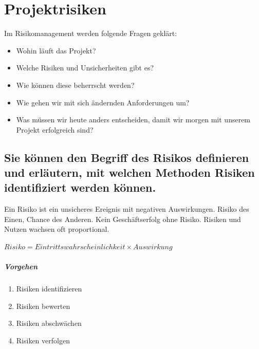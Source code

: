 \chapter{Projektrisiken}
Im Risikomanagement werden folgende Fragen geklärt:

\begin{itemize}
	\item Wohin läuft das Projekt?
	\item Welche Risiken und Unsicherheiten gibt es?
	\item Wie können diese beherrscht werden?
	\item Wie gehen wir mit sich ändernden Anforderungen um?
	\item Was müssen wir heute anders entscheiden, damit wir morgen mit unserem Projekt erfolgreich sind?
\end{itemize}

\section{Sie können den Begriff des Risikos definieren und erläutern, mit welchen Methoden Risiken identifiziert werden können.}
\label{sec:risikomanagement-definition-risiko}

Ein Risiko ist ein unsicheres Ereignis mit negativen Auswirkungen. Risiko des Einen, Chance des Anderen. Kein Geschäftserfolg ohne Risiko. Risiken und Nutzen wachsen oft proportional.

\begin{center}
	\begin{math}
		Risiko = Eintrittswahrscheinlichkeit \times Auswirkung
	\end{math}
\end{center}

\paragraph{Vorgehen}
\begin{enumerate}
	\item Risiken identifizieren
	\item Risiken bewerten
	\item Risiken abschwächen
	\item Risiken verfolgen 
\end{enumerate}

